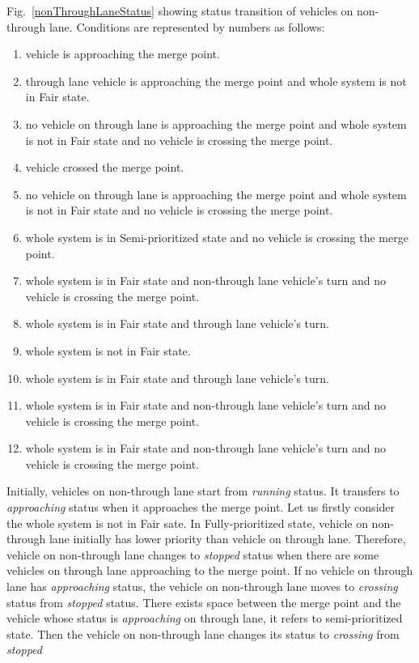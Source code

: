 \documentclass[10pt, conference, compsocconf]{IEEEtran}
\begin{document}
Fig.~\ref{nonThroughLaneStatus} showing status transition of vehicles on non-through lane.
Conditions are represented by numbers as follows:
\begin{enumerate}
    \item vehicle is approaching the merge point. %
    \item through lane vehicle is approaching the merge point and whole system is not in Fair state. %
    \item no vehicle on through lane is approaching the merge point and whole system is not in Fair state and no vehicle is crossing the merge point. %
    \item vehicle crossed the merge point. %
    \item no vehicle on through lane is approaching the merge point and whole system is not in Fair state and no vehicle is crossing the merge point. %
    \item whole system is in Semi-prioritized state and no vehicle is crossing the merge point. %
    \item whole system is in Fair state and non-through lane vehicle's turn and no vehicle is crossing the merge point. %
    \item whole system is in Fair state and through lane vehicle's turn. %
    \item whole system is not in Fair state. %
    \item whole system is in Fair state and through lane vehicle's turn. %
    \item whole system is in Fair state and non-through lane vehicle's turn and no vehicle is crossing the merge point. %
    \item whole system is in Fair state and non-through lane vehicle's turn and no vehicle is crossing the merge point. %
\end{enumerate}

Initially, vehicles on non-through lane start from \textit{running} status.
It transfers to \textit{approaching} status when it approaches the merge point.
Let us firstly consider the whole system is not in Fair sate.
In Fully-prioritized state, vehicle on non-through lane initially has lower priority than vehicle on through lane.
Therefore, vehicle on non-through lane changes to \textit{stopped} status when there are some vehicles on through lane approaching to the merge point.
If no vehicle on through lane has \textit{approaching} status, the vehicle on non-through lane moves to \textit{crossing} status from \textit{stopped} status.
There exists space between the merge point and the vehicle whose status is \textit{approaching} on through lane, it refers to semi-prioritized state. 
Then the vehicle on non-through lane changes its status to \textit{crossing} from \textit{stopped}
\end{document}

